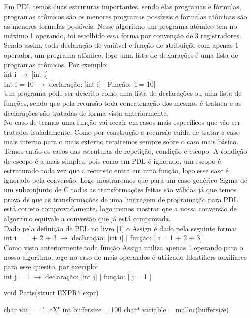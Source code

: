 \documentclass{article}
\begin{document}
Em PDL temos duas estruturas importantes, sendo elas programas e fórmulas, programas atômicos são os menores programas possíveis e formulas atômicas são as menores formulas possíveis. Nesse algoritmo um programa atômico tem no máximo 1 operando, foi escolhido essa forma por convenção de 3 registradores. Sendo assim, toda declaração de variável e função de atribuição com apenas 1 operador, um programa atômico, logo uma lista de declarações é uma lista de programas atômicos. Por exemplo:\\
\BlankLine
int i $\rightarrow$ [int i] \\
\BlankLine
Int i = 10 $\rightarrow$ declaração: [int i] $|$ Função: [i = 10] \\
\BlankLine
Um programa pode ser descrito como uma lista de declarações ou uma lista de funções, sendo que pela recursão toda concatenação dos mesmos é tratada e as declarações são tratadas de forma vista anteriormente. \\
\BlankLine
No caso de termos uma função vai recair em casos mais específicos que vão ser tratados isoladamente. Como por construção a recursão cuida de tratar o caso mais interno para o mais externo recairemos sempre sobre o caso mais básico. Temos então os casos das estruturas de repetição, condição e escopo. A condição de escopo é a mais simples, pois como em PDL é ignorado, um escopo é estruturado toda vez que a recursão entra em uma função, logo esse caso é ignorado pela conversão. Logo mostraremos que para um caso genérico Sigma de um subconjunto de C todas as transformações feitas são válidas já que temos prova de que as transformações de uma linguagem de programação para PDL está correto comprovadamente, logo iremos mostrar que a nossa conversão de algoritmo equivale a conversão que já está comprovada.\\
\BlankLine
Dado pela definição de PDL no livro [1] o Assign é dado pela seguinte forma:\\
\BlankLine
int i = 1 + 2 + 3 $\rightarrow$ declaração: [int i] $|$ função: [ i = 1 + 2 + 3]\\
\BlankLine
Como visto anteriormente toda função Assign utiliza apenas 1 operando para o nosso algoritmo, logo no caso de mais operandos é utilizado Identifiers auxiliares para esse quesito, por exemplo:\\
\BlankLine
int j = 1 $\rightarrow$ declaração: [int j] $|$ função: [ j = 1 ] \\
\BlankLine

\begin{algorithm}
	\caption{void Parts(struct EXPR* expr)}
	
	char var[] = "\_tX"\;
	int buffersize = 100\;
	char* variable = malloc(buffersize)\;
	
\end{algorithm}
\end{document}
